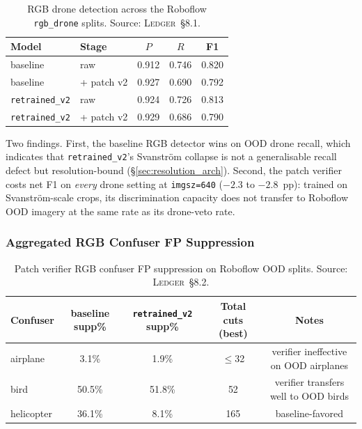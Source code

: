 \begin{table}[htbp]
    \centering
    \caption{RGB drone detection across the Roboflow \texttt{rgb\_drone} splits. Source: \textsc{Ledger}~\S8.1.}
    \label{tab:ood_rgb_drone}
    \begin{tabular}{llccc}
        \toprule
        Model & Stage & $P$ & $R$ & F1 \\
        \midrule
        baseline      & raw           & 0.912 & 0.746 & 0.820 \\
        baseline      & + patch v2    & 0.927 & 0.690 & 0.792 \\
        \texttt{retrained\_v2}  & raw           & 0.924 & 0.726 & 0.813 \\
        \texttt{retrained\_v2}  & + patch v2    & 0.929 & 0.686 & 0.790 \\
        \bottomrule
    \end{tabular}
\end{table}

Two findings. First, the baseline RGB detector wins on OOD drone recall, which indicates that \texttt{retrained\_v2}'s Svanstr\"om collapse is not a generalisable recall defect but resolution-bound (\S\ref{sec:resolution_arch}). Second, the patch verifier costs net F1 on \emph{every} drone setting at \texttt{imgsz=640} ($-2.3$ to $-2.8$~pp): trained on Svanstr\"om-scale crops, its discrimination capacity does not transfer to Roboflow OOD imagery at the same rate as its drone-veto rate.

\subsubsection{Aggregated RGB Confuser FP Suppression}

\begin{table}[htbp]
    \centering
    \caption{Patch verifier RGB confuser FP suppression on Roboflow OOD splits. Source: \textsc{Ledger}~\S8.2.}
    \label{tab:ood_rgb_confuser}
    \begin{tabular}{lcccc}
        \toprule
        Confuser & baseline supp\% & \texttt{retrained\_v2} supp\% & Total cuts (best) & Notes \\
        \midrule
        airplane   &  3.1\% &  1.9\% &  $\leq$32 & verifier ineffective on OOD airplanes \\
        bird       & 50.5\% & 51.8\% & 52 & verifier transfers well to OOD birds \\
        helicopter & 36.1\% &  8.1\% & 165 & baseline-favored \\
        \bottomrule
    \end{tabular}
\end{table}

